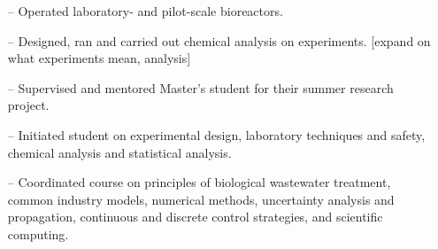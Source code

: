 \documentclass[10pt,a4paper]{altacv}
\begin{document}
\begin{itemize}
    \setlength{\itemindent}{0.5em}
    \item[--]   \small{Operated laboratory- and pilot-scale bioreactors.}
    \item[--]   \small{Designed, ran and carried out chemical analysis on experiments. [expand on what experiments mean, analysis]}
\end{itemize}

\divider\medskip







\newpage

\begin{itemize}
    \setlength{\itemindent}{0.5em}
    \item[--]   \small{Supervised and mentored Master's student for their summer research project.}
    \item[--]   \small{Initiated student on experimental design, laboratory techniques and safety, chemical analysis and statistical analysis.}
\end{itemize}
\divider\smallskip


\begin{itemize}
    \setlength{\itemindent}{0.5em}
    \item[--]   \small{Coordinated course on principles of biological wastewater treatment, common industry models, numerical methods, uncertainty analysis and propagation, continuous and discrete control strategies, and scientific computing.}
\end{itemize}
\divider\smallskip
\end{document}
